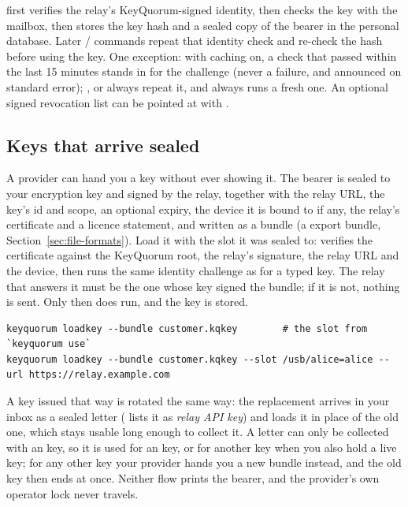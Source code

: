  first verifies the relay's KeyQuorum-signed identity, then
checks the key with the mailbox, then stores the key hash and a sealed copy
of the bearer in the personal database. Later  /  commands repeat that identity check and re-check the hash before
using the key. One exception: with caching on, a check that passed within the
last 15 minutes stands in for the challenge (never a failure, and announced on
standard error); ,  or
 always repeat it, and  always runs a
fresh one. An optional signed revocation list can be pointed at with
.

\subsection{Keys that arrive sealed}

A provider can hand you a key without ever showing it. The bearer is sealed
to your encryption key and signed by the relay, together with the relay URL,
the key's id and scope, an optional expiry, the device it is bound to if
any, the relay's certificate and a licence statement, and written as a
 bundle (a  export bundle,
Section~\ref{sec:file-formats}). Load it with the slot it was sealed to:
 verifies the certificate against the KeyQuorum root, the
relay's signature, the relay URL and the device, then runs the same identity
challenge as for a typed key. The relay that answers it must be the one whose
key signed the bundle; if it is not, nothing is sent. Only then does
 run, and the key is stored.

\begin{lstlisting}
keyquorum loadkey --bundle customer.kqkey        # the slot from `keyquorum use`
keyquorum loadkey --bundle customer.kqkey --slot /usb/alice=alice --url https://relay.example.com
\end{lstlisting}

A key issued that way is rotated the same way: the replacement arrives in
your inbox as a sealed  letter ( lists it as
\emph{relay API key}) and  loads it in place of the old
one, which stays usable long enough to collect it. A letter can only be
collected with an  key, so it is used for an
 key, or for another key when you also hold a live
 key; for any other key your provider hands you a new
 bundle instead, and the old key then ends at once. Neither flow
prints the bearer, and the provider's own operator lock never travels.

